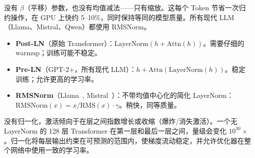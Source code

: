 没有 $\beta$（平移）参数，也没有均值减法——只有缩放。这每个 Token 节省一次归约操作，在 GPU 上快约 5--10\%，同时保持等同的模型质量。所有现代 LLM（Llama、Mistral、Qwen）都使用 RMSNorm。

\begin{keybox}
\begin{itemize}
  \item \textbf{Post-LN}（原始 Transformer）：$\text{LayerNorm}(h + \text{Attn}(h))$。需要仔细的 warmup；训练可能不稳定。
  \item \textbf{Pre-LN}（GPT-2+，所有现代 LLM）：$h + \text{Attn}(\text{LayerNorm}(h))$。稳定训练；允许更高的学习率。
  \item \textbf{RMSNorm}（Llama~\cite{grattafiori2024llama3}, Mistral~\cite{jiang2023mistral}）：不带均值中心化的简化 LayerNorm：$\text{RMSNorm}(x) = x / \text{RMS}(x) \cdot \gamma$。稍快，同等质量。
\end{itemize}
\end{keybox}

\begin{intuitionbox}[为什么归一化对深度网络很重要]
没有归一化，激活倾向于在层之间指数增长或收缩（爆炸/消失激活）。一个无 LayerNorm 的 128 层 Transformer 在第一层和最后一层之间，量级会变化 $10^{30}\times$。归一化将每层输出约束在可预测的范围内，使梯度流动稳定，并允许优化器在整个网络中使用一致的学习率。
\end{intuitionbox}

